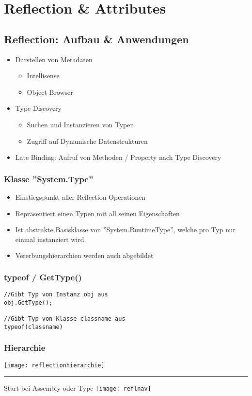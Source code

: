 \section{Reflection \& Attributes}
\begin{multicols*}{2}
\subsection{Reflection: Aufbau \& Anwendungen}
\begin{itemize}
    \item Darstellen von Metadaten
    \begin{itemize}
        \item Intellisense
        \item Object Browser
    \end{itemize}
    \item Type Discovery
    \begin{itemize}
        \item Suchen und Instanzieren von Typen
        \item Zugriff auf Dynamische Datenstrukturen
    \end{itemize}
    \item Late Binding: Aufruf von Methoden / Property nach Type Discovery
\end{itemize}
\subsubsection{Klasse ''System.Type''}
\begin{itemize}
    \item Einstiegspunkt aller Reflection-Operationen
    \item Repräsentiert einen Typen mit all seinen Eigenschaften
    \item Ist abstrakte Basisklasse von ''System.RuntimeType'', welche pro Typ nur einmal instanziert wird.
    \item Vererbungshierarchien werden auch abgebildet
\end{itemize}
\subsubsection{typeof / GetType()}
\begin{lstlisting}
//Gibt Typ von Instanz obj aus
obj.GetType();

//Gibt Typ von Klasse classname aus
typeof(classname)
\end{lstlisting}
\subsubsection{Hierarchie}
\texttt{[image: reflectionhierarchie]}
\hrule\vspace*{2mm}
 Start bei Assembly oder Type
\texttt{[image: reflnav]}


\end{multicols*}
